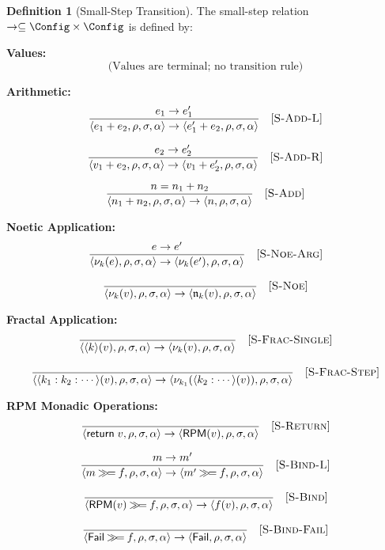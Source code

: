 \documentclass[11pt,twoside,openright]{book}
\theoremstyle{definition}
\newtheorem{definition}{Definition}[chapter]
\theoremstyle{plain}
\theoremstyle{remark}
\newcommand{\noe}[1]{\nu_{#1}}
\newcommand{\rpmret}{\mathsf{return}}
\newcommand{\rpmbind}{\mathbin{\gg\!=}}
\newcommand{\smallstep}{\to}
\newcommand{\Failed}{\mathsf{Fail}}
\begin{document}
\begin{definition}[Small-Step Transition]
\label{def:small-step}
The small-step relation $\smallstep \subseteq \Config \times \Config$ is defined by:

\textbf{Values:}
\[
\text{(Values are terminal; no transition rule)}
\]

\textbf{Arithmetic:}
\[
\frac{e_1 \smallstep e_1'}{\langle e_1 + e_2, \rho, \sigma, \alpha \rangle \smallstep \langle e_1' + e_2, \rho, \sigma, \alpha \rangle} \quad [\textsc{S-Add-L}]
\]

\[
\frac{e_2 \smallstep e_2'}{\langle v_1 + e_2, \rho, \sigma, \alpha \rangle \smallstep \langle v_1 + e_2', \rho, \sigma, \alpha \rangle} \quad [\textsc{S-Add-R}]
\]

\[
\frac{n = n_1 + n_2}{\langle n_1 + n_2, \rho, \sigma, \alpha \rangle \smallstep \langle n, \rho, \sigma, \alpha \rangle} \quad [\textsc{S-Add}]
\]

\textbf{Noetic Application:}
\[
\frac{e \smallstep e'}{\langle \noe{k}(e), \rho, \sigma, \alpha \rangle \smallstep \langle \noe{k}(e'), \rho, \sigma, \alpha \rangle} \quad [\textsc{S-Noe-Arg}]
\]

\[
\frac{}{\langle \noe{k}(v), \rho, \sigma, \alpha \rangle \smallstep \langle \mathfrak{n}_k(v), \rho, \sigma, \alpha \rangle} \quad [\textsc{S-Noe}]
\]

\textbf{Fractal Application:}
\[
\frac{}{\langle \langle k \rangle(v), \rho, \sigma, \alpha \rangle \smallstep \langle \noe{k}(v), \rho, \sigma, \alpha \rangle} \quad [\textsc{S-Frac-Single}]
\]

\[
\frac{}{\langle \langle k_1 : k_2 : \cdots \rangle(v), \rho, \sigma, \alpha \rangle \smallstep \langle \noe{k_1}(\langle k_2 : \cdots \rangle(v)), \rho, \sigma, \alpha \rangle} \quad [\textsc{S-Frac-Step}]
\]

\textbf{RPM Monadic Operations:}
\[
\frac{}{\langle \rpmret\; v, \rho, \sigma, \alpha \rangle \smallstep \langle \mathsf{RPM}(v), \rho, \sigma, \alpha \rangle} \quad [\textsc{S-Return}]
\]

\[
\frac{m \smallstep m'}{\langle m \rpmbind f, \rho, \sigma, \alpha \rangle \smallstep \langle m' \rpmbind f, \rho, \sigma, \alpha \rangle} \quad [\textsc{S-Bind-L}]
\]

\[
\frac{}{\langle \mathsf{RPM}(v) \rpmbind f, \rho, \sigma, \alpha \rangle \smallstep \langle f(v), \rho, \sigma, \alpha \rangle} \quad [\textsc{S-Bind}]
\]

\[
\frac{}{\langle \Failed \rpmbind f, \rho, \sigma, \alpha \rangle \smallstep \langle \Failed, \rho, \sigma, \alpha \rangle} \quad [\textsc{S-Bind-Fail}]
\]


\end{definition}
\end{document}
